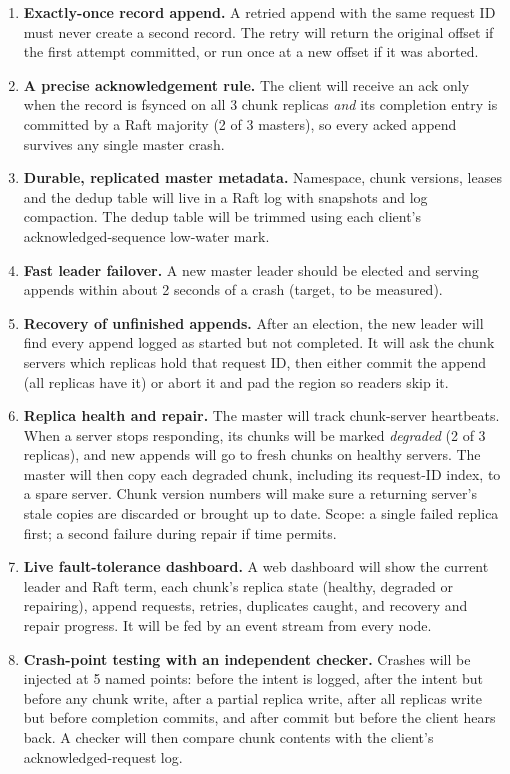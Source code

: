 \documentclass[10pt,a4paper]{article}
\begin{document}
\begin{enumerate}
  \item \textbf{Exactly-once record append.} A retried append with the same request ID must never create
        a second record. The retry will return the original offset if the first attempt committed, or
        run once at a new offset if it was aborted.
  \item \textbf{A precise acknowledgement rule.} The client will receive an ack only when the record is
        fsynced on all 3 chunk replicas \emph{and} its completion entry is committed by a Raft majority
        (2 of 3 masters), so every acked append survives any single master crash.
  \item \textbf{Durable, replicated master metadata.} Namespace, chunk versions, leases and the dedup
        table will live in a Raft log with snapshots and log compaction. The dedup table will be trimmed
        using each client's acknowledged-sequence low-water mark.
  \item \textbf{Fast leader failover.} A new master leader should be elected and serving appends within
        about 2 seconds of a crash (target, to be measured).
  \item \textbf{Recovery of unfinished appends.} After an election, the new leader will find every append
        logged as started but not completed. It will ask the chunk servers which replicas hold that request
        ID, then either commit the append (all replicas have it) or abort it and pad the region so readers
        skip it.
  \item \textbf{Replica health and repair.} The master will track chunk-server heartbeats. When a server
        stops responding, its chunks will be marked \emph{degraded} (2 of 3 replicas), and new appends will
        go to fresh chunks on healthy servers. The master will then copy each degraded chunk, including its
        request-ID index, to a spare server. Chunk version numbers will make sure a returning server's stale
        copies are discarded or brought up to date. Scope: a single failed replica first; a second failure
        during repair if time permits.
  \item \textbf{Live fault-tolerance dashboard.} A web dashboard will show the current leader and Raft term,
        each chunk's replica state (healthy, degraded or repairing), append requests, retries, duplicates
        caught, and recovery and repair progress. It will be fed by an event stream from every node.
  \item \textbf{Crash-point testing with an independent checker.} Crashes will be injected at 5 named points:
        before the intent is logged, after the intent but before any chunk write, after a partial replica
        write, after all replicas write but before completion commits, and after commit but before the
        client hears back. A checker will then compare chunk contents with the client's
        acknowledged-request log.
\end{enumerate}
\end{document}
